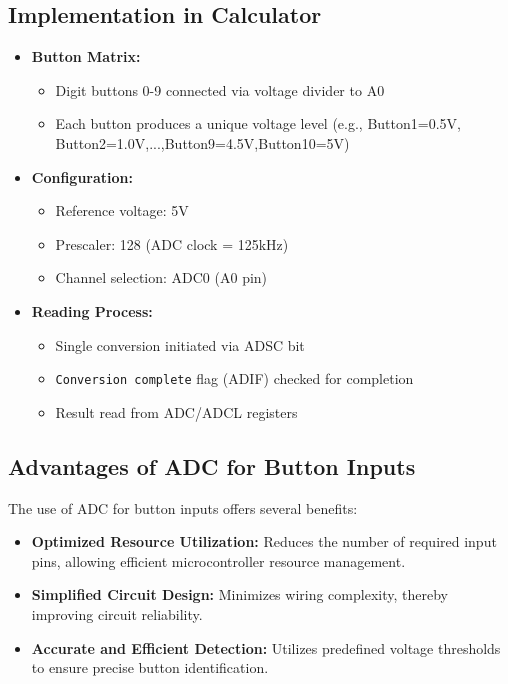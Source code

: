 \documentclass[a4paper,12pt]{article}
\theoremstyle{remark}
\begin{document}
\subsection{Implementation in Calculator}
\begin{itemize}
    \item \textbf{Button Matrix:}
    \begin{itemize}
        \item Digit buttons 0-9 connected via voltage divider to A0
        \item Each button produces a unique voltage level (e.g., Button1=0.5V, Button2=1.0V,...,Button9=4.5V,Button10=5V)
    \end{itemize}
    
    \item \textbf{Configuration:}
    \begin{itemize}
        \item Reference voltage: 5V
        \item Prescaler: 128 (ADC clock = 125kHz)
        \item Channel selection: ADC0 (A0 pin)
    \end{itemize}

    \item \textbf{Reading Process:}
    \begin{itemize}
        \item Single conversion initiated via ADSC bit
        \item \texttt{Conversion complete} flag (ADIF) checked for completion
        \item Result read from ADC/ADCL registers
    \end{itemize}
\end{itemize}

\subsection{Advantages of ADC for Button Inputs}
The use of ADC for button inputs offers several benefits:
\begin{itemize}
    \item \textbf{Optimized Resource Utilization:} Reduces the number of required input pins, allowing efficient microcontroller resource management.
    \item \textbf{Simplified Circuit Design:} Minimizes wiring complexity, thereby improving circuit reliability.
    \item \textbf{Accurate and Efficient Detection:} Utilizes predefined voltage thresholds to ensure precise button identification.
\end{itemize}
\end{document}
